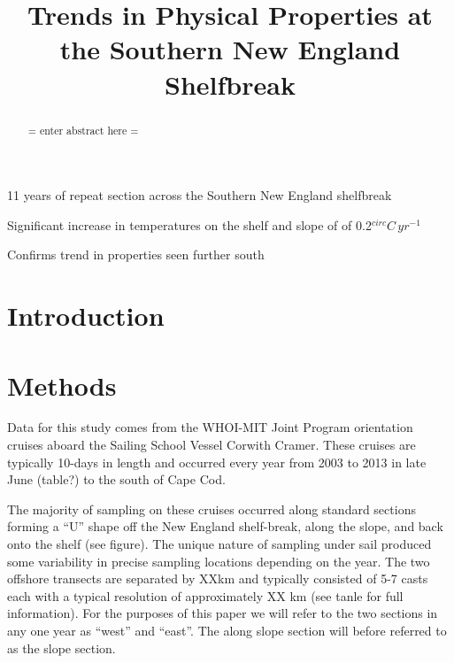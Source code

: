 \documentclass[draft,linenumbers]{agujournal}
\begin{document}
\title{Trends in Physical Properties at the Southern New England Shelfbreak}




\begin{keypoints}
\item 11 years of repeat section across the Southern New England shelfbreak
\item Significant increase in temperatures on the shelf and slope of of 0.2$^{circ}C\,yr^{-1}$
\item Confirms trend in properties seen further south
\end{keypoints}


\begin{abstract}
= enter abstract here =
\end{abstract}


\section{Introduction}


\section{Methods}

Data for this study comes from the WHOI-MIT Joint Program orientation cruises aboard the Sailing School Vessel Corwith Cramer. These cruises are typically 10-days in length and occurred every year from 2003 to 2013 in late June (table?) to the south of Cape Cod.

The majority of sampling on these cruises occurred along standard sections forming a “U” shape off the New England shelf-break, along the slope, and back onto the shelf (see figure). The unique nature of sampling under sail produced some variability in precise sampling locations depending on the year. The two offshore transects are separated by XXkm and typically consisted of 5-7 casts each with a typical resolution of approximately XX km (see tanle for full information). For the purposes of this paper we will refer to the two sections in any one year as “west” and “east”. The along slope section will before referred to as the slope section.
\end{document}
